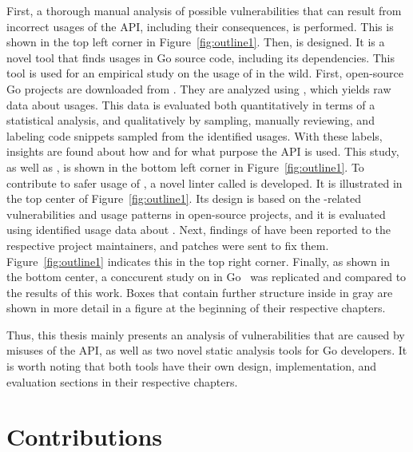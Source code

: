 

First, a thorough manual analysis of possible vulnerabilities that can result from incorrect usages of the \unsafe{}
\acrshort{API}, including their consequences, is performed.
This is shown in the top left corner in Figure~\ref{fig:outline1}.
Then, \toolGeiger{} is designed.
It is a novel tool that finds \unsafe{} usages in Go source code, including its dependencies.
This tool is used for an empirical study on the usage of \unsafe{} in the wild.
First, open-source Go projects are downloaded from \github{}.
They are analyzed using \toolGeiger{}, which yields raw data about \unsafe{} usages.
This data is evaluated both quantitatively in terms of a statistical analysis, and qualitatively by sampling,
manually reviewing, and labeling code snippets sampled from the identified \unsafe{} usages.
With these labels, insights are found about how and for what purpose the \unsafe{} \acrshort{API} is used.
This study, as well as \toolGeiger{}, is shown in the bottom left corner in Figure~\ref{fig:outline1}.
To contribute to safer usage of \unsafe{}, a novel linter called \toolSafer{} is developed.
It is illustrated in the top center of Figure~\ref{fig:outline1}.
Its design is based on the \unsafe{}-related vulnerabilities and \unsafe{} usage patterns in open-source projects,
and it is evaluated using identified usage data about \unsafe{}.
Next, findings of \toolSafer{} have been reported to the respective project maintainers, and patches were sent to fix
them.
Figure~\ref{fig:outline1} indicates this in the top right corner.
Finally, as shown in the bottom center, a conccurent study on \unsafe{} in Go~\cite{costa2020} was replicated and
compared to the results of this work.
Boxes that contain further structure inside in gray are shown in more detail in a figure at the beginning of their
respective chapters.

Thus, this thesis mainly presents an analysis of vulnerabilities that are caused by misuses of the \unsafe{}
\acrshort{API}, as well as two novel static analysis tools for Go developers.
It is worth noting that both tools have their own design, implementation, and evaluation sections in their respective
chapters.



\section{Contributions}\label{sec:introduction:contributions}

